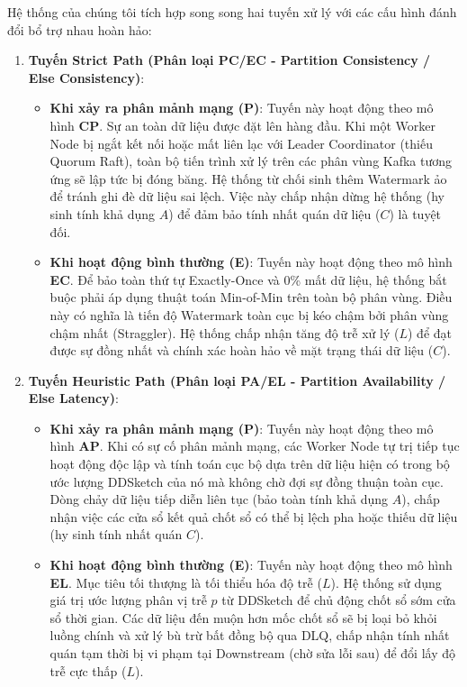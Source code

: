 \documentclass[12pt,a4paper]{article}
\begin{document}
Hệ thống của chúng tôi tích hợp song song hai tuyến xử lý với các cấu hình đánh đổi bổ trợ nhau hoàn hảo:
\begin{enumerate}
    \item \textbf{Tuyến Strict Path (Phân loại PC/EC - Partition Consistency / Else Consistency)}:
    \begin{itemize}
        \item \textbf{Khi xảy ra phân mảnh mạng (P)}: Tuyến này hoạt động theo mô hình \textbf{CP}. Sự an toàn dữ liệu được đặt lên hàng đầu. Khi một Worker Node bị ngắt kết nối hoặc mất liên lạc với Leader Coordinator (thiếu Quorum Raft), toàn bộ tiến trình xử lý trên các phân vùng Kafka tương ứng sẽ lập tức bị đóng băng. Hệ thống từ chối sinh thêm Watermark ảo để tránh ghi đè dữ liệu sai lệch. Việc này chấp nhận dừng hệ thống (hy sinh tính khả dụng $A$) để đảm bảo tính nhất quán dữ liệu ($C$) là tuyệt đối.
        \item \textbf{Khi hoạt động bình thường (E)}: Tuyến này hoạt động theo mô hình \textbf{EC}. Để bảo toàn thứ tự Exactly-Once và 0\% mất dữ liệu, hệ thống bắt buộc phải áp dụng thuật toán Min-of-Min trên toàn bộ phân vùng. Điều này có nghĩa là tiến độ Watermark toàn cục bị kéo chậm bởi phân vùng chậm nhất (Straggler). Hệ thống chấp nhận tăng độ trễ xử lý ($L$) để đạt được sự đồng nhất và chính xác hoàn hảo về mặt trạng thái dữ liệu ($C$).
    \end{itemize}
    
    \item \textbf{Tuyến Heuristic Path (Phân loại PA/EL - Partition Availability / Else Latency)}:
    \begin{itemize}
        \item \textbf{Khi xảy ra phân mảnh mạng (P)}: Tuyến này hoạt động theo mô hình \textbf{AP}. Khi có sự cố phân mảnh mạng, các Worker Node tự trị tiếp tục hoạt động độc lập và tính toán cục bộ dựa trên dữ liệu hiện có trong bộ ước lượng DDSketch của nó mà không chờ đợi sự đồng thuận toàn cục. Dòng chảy dữ liệu tiếp diễn liên tục (bảo toàn tính khả dụng $A$), chấp nhận việc các cửa sổ kết quả chốt sổ có thể bị lệch pha hoặc thiếu dữ liệu (hy sinh tính nhất quán $C$).
        \item \textbf{Khi hoạt động bình thường (E)}: Tuyến này hoạt động theo mô hình \textbf{EL}. Mục tiêu tối thượng là tối thiểu hóa độ trễ ($L$). Hệ thống sử dụng giá trị ước lượng phân vị trễ $p$ từ DDSketch để chủ động chốt sổ sớm cửa sổ thời gian. Các dữ liệu đến muộn hơn mốc chốt sổ sẽ bị loại bỏ khỏi luồng chính và xử lý bù trừ bất đồng bộ qua DLQ, chấp nhận tính nhất quán tạm thời bị vi phạm tại Downstream (chờ sửa lỗi sau) để đổi lấy độ trễ cực thấp ($L$).
    \end{itemize}
\end{enumerate}
\end{document}

